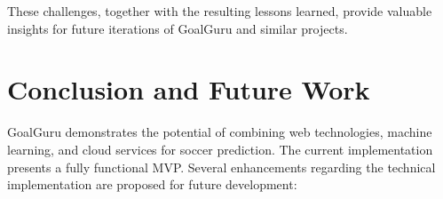 \documentclass[conference,a4paper,flushend]{cs-techrep}
\begin{document}
These challenges, together with the resulting lessons learned, provide valuable insights for future iterations of GoalGuru and similar projects.


\section{Conclusion and Future Work} \label{conclusion}

GoalGuru demonstrates the potential of combining web technologies, machine learning, and cloud services for soccer prediction. The current implementation presents a fully functional MVP. Several enhancements regarding the technical implementation are proposed for future development:
\end{document}
